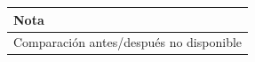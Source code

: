 \begin{tabular}{l}
\toprule
Nota \\
\midrule
Comparación antes/después no disponible \\
\bottomrule
\end{tabular}
